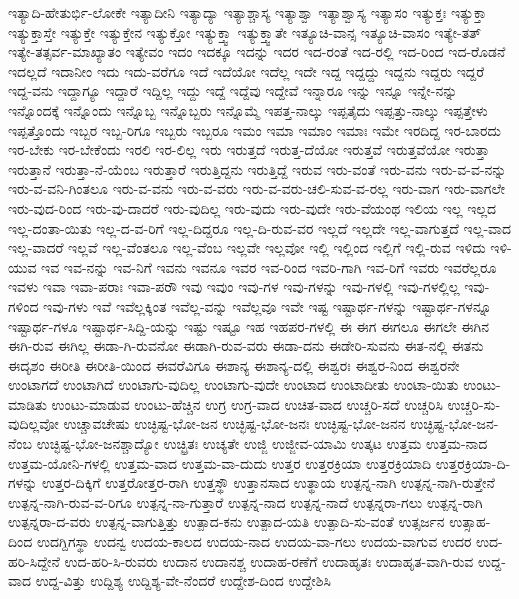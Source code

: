 {ಇತ್ಯಾದಿ-ಹೇತುರ್ಭಿ-ಲೋಕೇ
ಇತ್ಯಾದೀನಿ
ಇತ್ಯಾದ್ಯಾ
ಇತ್ಯಾಶ್ಚಾಸ್ಯ
ಇತ್ಯಾಶ್ವಾ
ಇತ್ಯಾಶ್ವಾಸ್ಯ
ಇತ್ಯಾಸಂ
ಇತ್ಯುಕ್ತಃ
ಇತ್ಯುಕ್ತಾ
ಇತ್ಯುಕ್ತಾಸ್ತೇ
ಇತ್ಯುಕ್ತೇ
ಇತ್ಯುಕ್ತೇನ
ಇತ್ಯುಕ್ತೋ
ಇತ್ಯುಕ್ತ್ವಾ
ಇತ್ಯುಕ್ತ್ವಾತೇ
ಇತ್ಯೂಚಿ-ವಾನ್ಸ
ಇತ್ಯೂಚಿ-ವಾಸಂ
ಇತ್ಯೇ-ತತ್
ಇತ್ಯೇ-ತತ್ಸರ್ವ-ಮಾಖ್ಯಾತಂ
ಇತ್ಯೇವಂ
ಇದಂ
ಇದಕ್ಕೂ
ಇದನ್ನು
ಇದರ
ಇದ-ರಂತೆ
ಇದ-ರಲ್ಲಿ
ಇದ-ರಿಂದ
ಇದ-ರೊಡನೆ
ಇದಲ್ಲದೆ
ಇದಾನೀಂ
ಇದು
ಇದು-ವರೆಗೂ
ಇದೆ
ಇದೆಯೋ
ಇದೆಲ್ಲ
ಇದೇ
ಇದ್ದ
ಇದ್ದದ್ದು
ಇದ್ದನು
ಇದ್ದರು
ಇದ್ದರೆ
ಇದ್ದ-ವನು
ಇದ್ದಾಗ್ಯೂ
ಇದ್ದಾರೆ
ಇದ್ದಿಲ್ಲ
ಇದ್ದು
ಇದ್ದೆ
ಇದ್ದೆವು
ಇದ್ದೇವೆ
ಇನ್ನಾರೂ
ಇನ್ನು
ಇನ್ನೂ
ಇನ್ನೇ-ನನ್ನು
ಇನ್ನೊಂದಕ್ಕೆ
ಇನ್ನೊಂದು
ಇನ್ನೊಬ್ಬ
ಇನ್ನೊಬ್ಬರು
ಇನ್ನೊಮ್ಮೆ
ಇಪತ್ತ-ನಾಲ್ಕು
ಇಪ್ಪತೈದು
ಇಪ್ಪತ್ತು-ನಾಲ್ಕು
ಇಪ್ಪತ್ತೇಳು
ಇಪ್ಪತ್ತೊಂದು
ಇಬ್ಬರ
ಇಬ್ಬ-ರಿಗೂ
ಇಬ್ಬರು
ಇಬ್ಬರೂ
ಇಮಂ
ಇಮಾ
ಇಮಾಂ
ಇಮಾಃ
ಇಮೇ
ಇರದಿದ್ದ
ಇರ-ಬಾರದು
ಇರ-ಬೇಕು
ಇರ-ಬೇಕೆಂದು
ಇರಲಿ
ಇರ-ಲಿಲ್ಲ
ಇರು
ಇರುತ್ತದೆ
ಇರುತ್ತ-ದೆಯೋ
ಇರುತ್ತವೆ
ಇರುತ್ತವೆಯೋ
ಇರುತ್ತಾ
ಇರುತ್ತಾನೆ
ಇರುತ್ತಾ-ನೆ-ಯೆಂಬ
ಇರುತ್ತಾರೆ
ಇರುತ್ತಿದ್ದನು
ಇರುತ್ತಿದ್ದೆ
ಇರುವ
ಇರು-ವಂತೆ
ಇರು-ವನು
ಇರು-ವ-ವ-ನನ್ನು
ಇರು-ವ-ವನಿ-ಗಿಂತಲೂ
ಇರು-ವ-ವನು
ಇರು-ವ-ವರು
ಇರು-ವ-ವರು-ಚಲಿ-ಸುವ-ವ-ರಲ್ಲ
ಇರು-ವಾಗ
ಇರು-ವಾಗಲೇ
ಇರು-ವುದ-ರಿಂದ
ಇರು-ವು-ದಾದರೆ
ಇರು-ವುದಿಲ್ಲ
ಇರು-ವುದು
ಇರು-ವುದೇ
ಇರು-ವೆಯಂಥ
ಇಲಿಯ
ಇಲ್ಲ
ಇಲ್ಲದ
ಇಲ್ಲ-ದಂತಾ-ಯಿತು
ಇಲ್ಲ-ದ-ವ-ರಿಗೆ
ಇಲ್ಲ-ದಿದ್ದರೂ
ಇಲ್ಲ-ದಿ-ರುವ-ವರ
ಇಲ್ಲದೆ
ಇಲ್ಲದೇ
ಇಲ್ಲ-ವಾಗುತ್ತದೆ
ಇಲ್ಲ-ವಾದ
ಇಲ್ಲ-ವಾದರೆ
ಇಲ್ಲವೆ
ಇಲ್ಲ-ವೆಂತಲೂ
ಇಲ್ಲ-ವೆಂಬ
ಇಲ್ಲವೇ
ಇಲ್ಲವೋ
ಇಲ್ಲಿ
ಇಲ್ಲಿಂದ
ಇಲ್ಲಿಗೆ
ಇಲ್ಲಿ-ರುವ
ಇಳಿದು
ಇಳಿ-ಯುವ
ಇವ
ಇವ-ನನ್ನು
ಇವ-ನಿಗೆ
ಇವನು
ಇವನೂ
ಇವರ
ಇವ-ರಿಂದ
ಇವರಿ-ಗಾಗಿ
ಇವ-ರಿಗೆ
ಇವರು
ಇವರೆಲ್ಲರೂ
ಇವಳು
ಇವಾ
ಇವಾ-ಪರಾಃ
ಇವಾ-ಪರೌ
ಇವು
ಇವುಂ
ಇವು-ಗಳ
ಇವು-ಗಳನ್ನು
ಇವು-ಗಳಲ್ಲಿ
ಇವು-ಗಳಲ್ಲಿಲ್ಲ
ಇವು-ಗಳಿಂದ
ಇವು-ಗಳು
ಇವೆ
ಇವೆಲ್ಲಕ್ಕಿಂತ
ಇವೆಲ್ಲ-ವನ್ನು
ಇವೆಲ್ಲವೂ
ಇವೇ
ಇಷ್ಟ
ಇಷ್ಟಾರ್ಥ-ಗಳನ್ನು
ಇಷ್ಟಾರ್ಥ-ಗಳನ್ನೂ
ಇಷ್ಟಾರ್ಥ-ಗಳೂ
ಇಷ್ಟಾರ್ಥ-ಸಿದ್ದಿ-ಯನ್ನು
ಇಷ್ಟು
ಇಷ್ಟೂ
ಇಹ
ಇಹಪರ-ಗಳಲ್ಲಿ
ಈ
ಈಗ
ಈಗಲೂ
ಈಗಲೇ
ಈಗಿನ
ಈಗಿ-ರುವ
ಈಗಿಲ್ಲ
ಈಡಾ-ಗಿ-ರುವನೋ
ಈಡಾಗಿ-ರುವ-ವರು
ಈಡಾ-ದನು
ಈಡೇರಿ-ಸುವನು
ಈತ-ನಲ್ಲಿ
ಈತನು
ಈದೃಶಂ
ಈರೀತಿ
ಈರೀತಿ-ಯಿಂದ
ಈವರೆವಿಗೂ
ಈಶಾನ್ಯ
ಈಶಾನ್ಯ-ದಲ್ಲಿ
ಈಶ್ವರಃ
ಈಶ್ವರ-ನಿಂದ
ಈಶ್ವರನೇ
ಉಂಟಾಗದೆ
ಉಂಟಾಗಿದೆ
ಉಂಟಾಗು-ವುದಿಲ್ಲ
ಉಂಟಾಗು-ವುದೇ
ಉಂಟಾದ
ಉಂಟಾದೀತು
ಉಂಟಾ-ಯಿತು
ಉಂಟು-ಮಾಡಿತು
ಉಂಟು-ಮಾಡುವ
ಉಂಟು-ಹೆಚ್ಚಿನ
ಉಗ್ರ
ಉಗ್ರ-ವಾದ
ಉಚಿತ-ವಾದ
ಉಚ್ಚರಿ-ಸದೆ
ಉಚ್ಚರಿಸಿ
ಉಚ್ಚರಿ-ಸು-ವುದಿಲ್ಲವೋ
ಉಚ್ಚಾವಚೇಷು
ಉಚ್ಛಿಷ್ಟ-ಭೋ-ಜನ
ಉಚ್ಛಿಷ್ಟ-ಭೋ-ಜನಃ
ಉಚ್ಛಿಷ್ಟ-ಭೋ-ಜನನ
ಉಚ್ಛಿಷ್ಟ-ಭೋ-ಜನ-ನೆಂಬ
ಉಚ್ಛಿಷ್ಟ-ಭೋ-ಜನಶ್ಚಾದ್ಯೋ
ಉಚ್ಛ್ರಿತಃ
ಉಚ್ಯತೇ
ಉಜ್ಜಿ
ಉಜ್ಜೀವ-ಯಾಮಿ
ಉತ್ಕಟ
ಉತ್ತಮ
ಉತ್ತಮ-ನಾದ
ಉತ್ತಮ-ಯೋನಿ-ಗಳಲ್ಲಿ
ಉತ್ತಮ-ವಾದ
ಉತ್ತಮ-ವಾ-ದುದು
ಉತ್ತರ
ಉತ್ತರಕ್ರಿಯಾ
ಉತ್ತರಕ್ರಿಯಾದಿ
ಉತ್ತರಕ್ರಿಯಾ-ದಿ-ಗಳನ್ನು
ಉತ್ತರ-ದಿಕ್ಕಿಗೆ
ಉತ್ತರೋತ್ತರ-ರಾಗಿ
ಉತ್ತಸ್ಥೌ
ಉತ್ತಾನಸಾದ
ಉತ್ಥಾಯ
ಉತ್ಪನ್ನ-ನಾಗಿ
ಉತ್ಪನ್ನ-ನಾಗಿ-ರುತ್ತೇನೆ
ಉತ್ಪನ್ನ-ನಾಗಿ-ರುವ-ವ-ರಿಗೂ
ಉತ್ಪನ್ನ-ನಾ-ಗುತ್ತಾರೆ
ಉತ್ಪನ್ನ-ನಾದ
ಉತ್ಪನ್ನ-ನಾದೆ
ಉತ್ಪನ್ನರಾ-ಗಲು
ಉತ್ಪನ್ನ-ರಾಗಿ
ಉತ್ಪನ್ನರಾ-ದ-ವರು
ಉತ್ಪನ್ನ-ವಾಗುತ್ತಿತ್ತು
ಉತ್ಪಾದ-ಕನು
ಉತ್ಪಾದ-ಯತಿ
ಉತ್ಪಾದಿ-ಸು-ವಂತೆ
ಉತ್ಸರ್ಜನ
ಉತ್ಸಾಹ-ದಿಂದ
ಉದಗ್ದಿಗಸ್ಥಾ
ಉದನ್ವ
ಉದಯ-ಕಾಲದ
ಉದಯ-ನಾದ
ಉದಯ-ವಾ-ಗಲು
ಉದಯ-ವಾಗುವ
ಉದರ
ಉದ-ಹರಿ-ಸಿದ್ದೇನೆ
ಉದ-ಹರಿ-ಸಿ-ರುವರು
ಉದಾನ
ಉದಾನಶ್ಚ
ಉದಾಹ-ರಣೆಗೆ
ಉದಾಹೃತಃ
ಉದಾಹೃತ-ವಾಗಿ-ರುವ
ಉದ್ದ-ವಾದ
ಉದ್ದ-ವಿತ್ತು
ಉದ್ದಿಶ್ಯ
ಉದ್ದಿಶ್ಯ-ವೇ-ನೆಂದರೆ
ಉದ್ದೇಶ-ದಿಂದ
ಉದ್ದೇಶಿಸಿ
}
